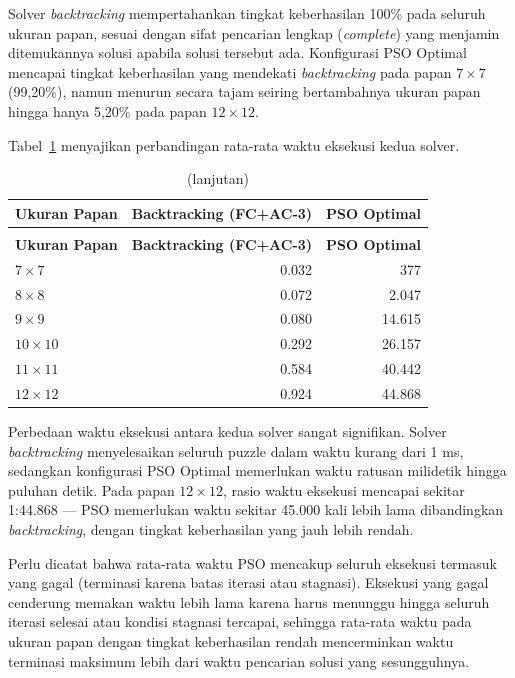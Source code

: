 Solver \textit{backtracking} mempertahankan tingkat keberhasilan 100\% pada seluruh ukuran papan, sesuai dengan sifat pencarian lengkap (\textit{complete}) yang menjamin ditemukannya solusi apabila solusi tersebut ada. Konfigurasi PSO Optimal mencapai tingkat keberhasilan yang mendekati \textit{backtracking} pada papan $7 \times 7$ 
(99,20\%), namun menurun secara tajam seiring bertambahnya ukuran papan hingga hanya 5,20\% pada papan $12 \times 12$.

Tabel~\ref{tab:perbandingan-time} menyajikan perbandingan rata-rata waktu eksekusi kedua solver.

\begin{longtable}{lrr}
	\caption{Perbandingan rata-rata waktu eksekusi (ms) \textit{Backtracking} dan PSO Optimal}
	\label{tab:perbandingan-time} \\
	\toprule
	\textbf{Ukuran Papan} & \textbf{Backtracking (FC+AC-3)} & \textbf{PSO Optimal} \\
	\midrule
	\endfirsthead
	\caption[]{(lanjutan)} \\
	\toprule
	\textbf{Ukuran Papan} & \textbf{Backtracking (FC+AC-3)} & \textbf{PSO Optimal} \\
	\midrule
	\endhead
	\bottomrule
	\endfoot
	$7 \times 7$   &  0.032 &     377 \\
	$8 \times 8$   &  0.072 &   2.047 \\
	$9 \times 9$   &  0.080 &  14.615 \\
	$10 \times 10$ &  0.292 &  26.157 \\
	$11 \times 11$ &  0.584 &  40.442 \\
	$12 \times 12$ &  0.924 &  44.868 \\
\end{longtable}

Perbedaan waktu eksekusi antara kedua solver sangat signifikan. Solver \textit{backtracking} menyelesaikan seluruh puzzle dalam waktu kurang dari 1 ms, sedangkan konfigurasi PSO Optimal memerlukan waktu ratusan milidetik hingga puluhan detik. Pada papan $12 \times 12$, rasio waktu eksekusi mencapai sekitar 1:44.868 — PSO memerlukan waktu sekitar 45.000 kali lebih lama dibandingkan \textit{backtracking}, dengan tingkat keberhasilan yang jauh lebih rendah.

Perlu dicatat bahwa rata-rata waktu PSO mencakup seluruh eksekusi termasuk yang gagal (terminasi karena batas iterasi atau stagnasi). Eksekusi yang gagal cenderung memakan waktu lebih lama karena harus menunggu hingga seluruh iterasi selesai atau kondisi stagnasi tercapai, sehingga rata-rata waktu pada ukuran papan dengan tingkat keberhasilan rendah mencerminkan waktu terminasi maksimum lebih dari waktu pencarian solusi yang sesungguhnya.

